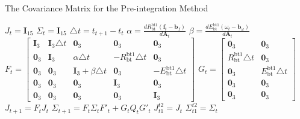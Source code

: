\documentclass[12pt]{article}   %
\begin{document}
\begin{algorithm}[h!]
	\caption{The Covariance Matrix for the Pre-integration Method}
	\label{algm:preint_cov}
	\begin{algorithmic}%
		\STATE $J_t = \textbf{I}_{15}$ 
		\STATE ${\Sigma}_t = \textbf{I}_{15}$ 
		\STATE $\triangle t =  t_{t+1} - t_t$ 
		\STATE $\alpha = \frac{d R^{\mathrm{bt1}}_{\mathrm{bt}} (\textbf{f}_t - \textbf{b}_f)}{d \textbf{A}_t}$
		\STATE $\beta = \frac{d E^{\mathrm{bt1}}_{\mathrm{bt}} (\omega_t - \textbf{b}_\omega)}{d \textbf{A}_t}$
		\STATE $F_t = \begin{bmatrix} \textbf{I}_3 & \textbf{I}_3 \triangle t & \textbf{0}_3 & \textbf{0}_3 & \textbf{0}_3 \\ 
		\textbf{0}_3 & \textbf{I}_3  & \alpha \triangle t & -R^{\mathrm{bt1}}_{\mathrm{bt}} \triangle t & \textbf{0}_3 \\ 
		\textbf{0}_3 & \textbf{0}_3 & \textbf{I}_3 + \beta \triangle t & \textbf{0}_3 & -E^{\mathrm{bt1}}_{\mathrm{bt}} \triangle t \\
		\textbf{0}_3 & \textbf{0}_3 & \textbf{0}_3 & \textbf{I}_3 & \textbf{0}_3 \\
		\textbf{0}_3 & \textbf{0}_3 & \textbf{0}_3 & \textbf{0}_3 & \textbf{I}_3
		\end{bmatrix}$
		\STATE $G_t = \begin{bmatrix} \textbf{0}_3 & \textbf{0}_3 \\ R^{\mathrm{bt1}}_{\mathrm{bt}} \triangle t & \textbf{0}_3 \\ \textbf{0}_3 & E^{\mathrm{bt1}}_{\mathrm{bt}} \triangle t \\ \textbf{0}_3 & \textbf{0}_3 \\ \textbf{0}_3 & \textbf{0}_3 \end{bmatrix}$
		\STATE $J_{t+1} = F_{t} J_t$ 
		\STATE ${\Sigma}_{t+1} = F_{t} {\Sigma}_t F'_{t} + G_t Q_t G'_t$ 
		\ENDFOR
		\STATE $J^{t2}_{t1} = J_{t}$
		\STATE ${\Sigma}^{t2}_{t1} = {\Sigma}_{t}$
	\end{algorithmic}
\end{algorithm}
\end{document}
